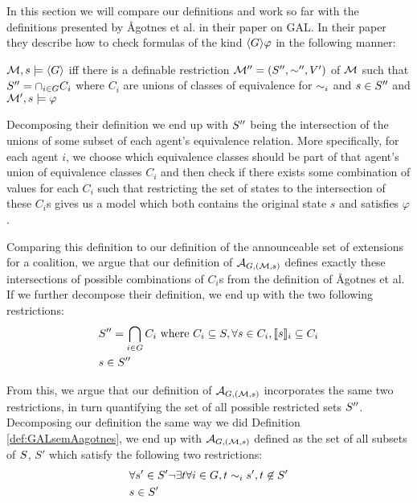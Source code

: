 In this section we will compare our definitions and work so far with the definitions presented by Ågotnes et al. in their paper on GAL. In their paper they describe how to check formulas of the kind $\langle G\rangle\varphi$ in the following manner:

\begin{definition}
	\label{def:GALsemAagotnes}
	$\mathcal{M},s\models \langle G\rangle$ iff there is a definable restriction $\mathcal{M}'' = (S'',\sim'',V')$ of $\mathcal{M}$  such that $S'' = \cap_{i\in G}C_i$ where  $C_i$  are unions of classes of equivalence for $\sim_i$ and $s\in S''$ and $\mathcal{M}',s\models\varphi$
\end{definition}

Decomposing their definition we end up with $S''$ being the intersection of the unions of some subset of each agent's equivalence relation. More specifically, for each agent $i$, we choose which equivalence classes 
should be part of that agent's union of equivalence classes $C_i$ and then check if there exists some combination of values for each $C_i$ such that restricting the set of states to the intersection of these $C_i$s gives us a model which both contains the original state $s$ and satisfies $\varphi$.

Comparing this definition to our definition of the announceable set of extensions for a coalition, we argue that our definition of $\mathcal{A}_{G,(\mathcal{M},s)}$ defines exactly these intersections of possible combinations of $C_i$s from the definition of Ågotnes et al. If we further decompose their definition, we end up with the two following restrictions:
\begin{align}
	&S'' = \bigcap_{i\in G}C_i \textrm{ where } C_i \subseteq S, \forall s\in C_i, \llbracket s\rrbracket_i\subseteq C_i \\
	&s \in S''
\end{align}

From this, we argue that our definition of $\mathcal{A}_{G,(\mathcal{M},s)}$ incorporates the same two restrictions, in turn quantifying the set of all possible restricted sets $S''$. Decomposing our definition the same way we did Definition \ref{def:GALsemAagotnes}, we end up with $\mathcal{A}_{G,(\mathcal{M},s)}$ defined as the set of all subsets of $S$, $S'$ which satisfy the following two restrictions:
\begin{align}
	&\forall s'\in S' \neg\exists t\forall i \in G, t\sim_i s', t\not\in S' \\
	&s\in S'
\end{align}

